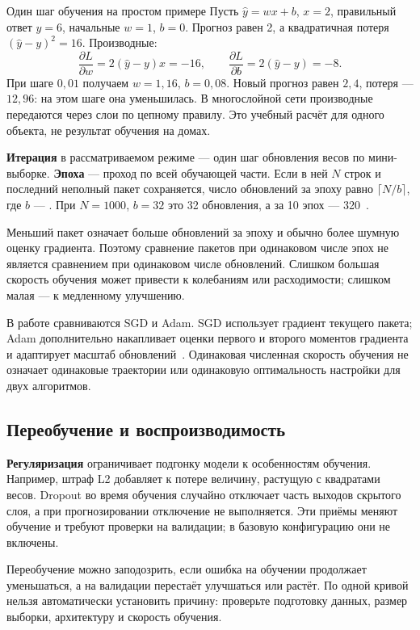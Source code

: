 \begin{keybox}{Один шаг обучения на простом примере}
Пусть \(\widehat y=wx+b\), \(x=2\), правильный ответ \(y=6\),
начальные \(w=1\), \(b=0\). Прогноз равен 2, а квадратичная потеря
\((\widehat y-y)^2=16\). Производные:
\[
\frac{\partial L}{\partial w}=2(\widehat y-y)x=-16,\qquad
\frac{\partial L}{\partial b}=2(\widehat y-y)=-8.
\]
При шаге \(0{,}01\) получаем \(w=1{,}16\), \(b=0{,}08\).
Новый прогноз равен \(2{,}4\), потеря --- \(12{,}96\): на этом шаге
она уменьшилась. В многослойной сети производные передаются через слои
по цепному правилу. Это учебный расчёт для одного объекта, не результат
обучения на домах.
\end{keybox}

\textbf{Итерация} в рассматриваемом режиме --- один шаг обновления весов
по мини-выборке. \textbf{Эпоха} --- проход по всей обучающей части.
Если в ней \(N\) строк и последний неполный пакет сохраняется, число
обновлений за эпоху равно \(\lceil N/b\rceil\), где \(b\) ---
. При \(N=1000\), \(b=32\) это 32 обновления,
а за 10 эпох --- 320~\cite{training}.

Меньший пакет означает больше обновлений за эпоху и обычно более шумную
оценку градиента. Поэтому сравнение пакетов при одинаковом числе эпох
не является сравнением при одинаковом числе обновлений.
Слишком большая скорость обучения может привести к колебаниям или
расходимости; слишком малая --- к медленному улучшению.

В работе сравниваются SGD и Adam. SGD использует градиент текущего
пакета; Adam дополнительно накапливает оценки первого и второго моментов
градиента и адаптирует масштаб обновлений~\cite{sgd,adam}.
Одинаковая численная скорость обучения не означает одинаковые траектории
или одинаковую оптимальность настройки для двух алгоритмов.

\subsection{Переобучение и воспроизводимость}
\textbf{Регуляризация} ограничивает подгонку модели к особенностям
обучения. Например, штраф L2 добавляет к потере величину, растущую с
квадратами весов. Dropout во время обучения случайно отключает часть
выходов скрытого слоя, а при прогнозировании отключение не выполняется.
Эти приёмы меняют обучение и требуют проверки на валидации; в базовую
конфигурацию они не включены.

Переобучение можно заподозрить, если ошибка на обучении продолжает
уменьшаться, а на валидации перестаёт улучшаться или растёт.
По одной кривой нельзя автоматически установить причину: проверьте
подготовку данных, размер выборки, архитектуру и скорость обучения.

